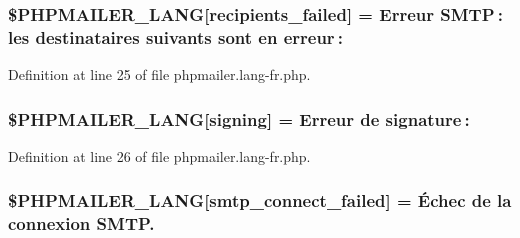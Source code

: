 \subsubsection[{\texorpdfstring{\$\+P\+H\+P\+M\+A\+I\+L\+E\+R\+\_\+\+L\+A\+NG}{$PHPMAILER_LANG}}]{\setlength{\rightskip}{0pt plus 5cm}\$P\+H\+P\+M\+A\+I\+L\+E\+R\+\_\+\+L\+A\+NG\mbox{[}\textquotesingle{}recipients\+\_\+failed\textquotesingle{}\mbox{]} = \textquotesingle{}Erreur S\+M\+T\+P \+: les destinataires suivants sont en erreur \+: \textquotesingle{}}\hypertarget{phpmailer_8lang-fr_8php_a7589d30bb9b368327c2df015f3e6bcba}{}\label{phpmailer_8lang-fr_8php_a7589d30bb9b368327c2df015f3e6bcba}


Definition at line 25 of file phpmailer.\+lang-\/fr.\+php.

\subsubsection[{\texorpdfstring{\$\+P\+H\+P\+M\+A\+I\+L\+E\+R\+\_\+\+L\+A\+NG}{$PHPMAILER_LANG}}]{\setlength{\rightskip}{0pt plus 5cm}\$P\+H\+P\+M\+A\+I\+L\+E\+R\+\_\+\+L\+A\+NG\mbox{[}\textquotesingle{}signing\textquotesingle{}\mbox{]} = \textquotesingle{}Erreur de signature \+: \textquotesingle{}}\hypertarget{phpmailer_8lang-fr_8php_a68e437bdb9b968a5a67320f03d231565}{}\label{phpmailer_8lang-fr_8php_a68e437bdb9b968a5a67320f03d231565}


Definition at line 26 of file phpmailer.\+lang-\/fr.\+php.

\subsubsection[{\texorpdfstring{\$\+P\+H\+P\+M\+A\+I\+L\+E\+R\+\_\+\+L\+A\+NG}{$PHPMAILER_LANG}}]{\setlength{\rightskip}{0pt plus 5cm}\$P\+H\+P\+M\+A\+I\+L\+E\+R\+\_\+\+L\+A\+NG\mbox{[}\textquotesingle{}smtp\+\_\+connect\+\_\+failed\textquotesingle{}\mbox{]} = \textquotesingle{}Échec de la connexion S\+M\+T\+P.\textquotesingle{}}\hypertarget{phpmailer_8lang-fr_8php_a7b321d4ca1e9df702403ed4c61aa0980}{}\label{phpmailer_8lang-fr_8php_a7b321d4ca1e9df702403ed4c61aa0980}


